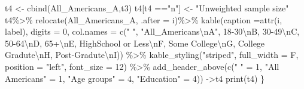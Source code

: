 \documentclass[
]{article}
\newenvironment{Shaded}{\begin{snugshade}}{\end{snugshade}}
\newcommand{\AttributeTok}[1]{\textcolor[rgb]{0.77,0.63,0.00}{#1}}
\newcommand{\DecValTok}[1]{\textcolor[rgb]{0.00,0.00,0.81}{#1}}
\newcommand{\FunctionTok}[1]{\textcolor[rgb]{0.00,0.00,0.00}{#1}}
\newcommand{\NormalTok}[1]{#1}
\newcommand{\OtherTok}[1]{\textcolor[rgb]{0.56,0.35,0.01}{#1}}
\newcommand{\SpecialCharTok}[1]{\textcolor[rgb]{0.00,0.00,0.00}{#1}}
\newcommand{\StringTok}[1]{\textcolor[rgb]{0.31,0.60,0.02}{#1}}
\begin{document}
\begin{Shaded}
\begin{Highlighting}[]
\NormalTok{t4 }\OtherTok{\textless{}{-}} \FunctionTok{cbind}\NormalTok{(All\_Americans\_A,t3)}
\NormalTok{t4[t4 }\SpecialCharTok{==}\StringTok{"n"}\NormalTok{] }\OtherTok{\textless{}{-}} \StringTok{"Unweighted sample size"}
\NormalTok{t4}\SpecialCharTok{\%\textgreater{}\%}
  \FunctionTok{relocate}\NormalTok{(All\_Americans\_A, }\AttributeTok{.after =}\NormalTok{ i)}\SpecialCharTok{\%\textgreater{}\%}
  \FunctionTok{kable}\NormalTok{(}\AttributeTok{caption =}\FunctionTok{attr}\NormalTok{(i, }\StringTok{\textquotesingle{}label\textquotesingle{}}\NormalTok{), }\AttributeTok{digits =} \DecValTok{0}\NormalTok{, }
        \AttributeTok{col.names =} \FunctionTok{c}\NormalTok{(}\StringTok{" "}\NormalTok{, }\StringTok{"All\_Americans}\SpecialCharTok{\textbackslash{}n}\StringTok{A"}\NormalTok{, }\StringTok{\textquotesingle{}18{-}30}\SpecialCharTok{\textbackslash{}n}\StringTok{B\textquotesingle{}}\NormalTok{, }\StringTok{\textquotesingle{}30{-}49}\SpecialCharTok{\textbackslash{}n}\StringTok{C\textquotesingle{}}\NormalTok{, }\StringTok{\textquotesingle{}50{-}64}\SpecialCharTok{\textbackslash{}n}\StringTok{D\textquotesingle{}}\NormalTok{, }\StringTok{\textquotesingle{}65+}\SpecialCharTok{\textbackslash{}n}\StringTok{E\textquotesingle{}}\NormalTok{,}
                      \StringTok{\textquotesingle{}HighSchool or Less}\SpecialCharTok{\textbackslash{}n}\StringTok{F\textquotesingle{}}\NormalTok{, }\StringTok{\textquotesingle{}Some College}\SpecialCharTok{\textbackslash{}n}\StringTok{G\textquotesingle{}}\NormalTok{, }\StringTok{\textquotesingle{}College  Gradute}\SpecialCharTok{\textbackslash{}n}\StringTok{H\textquotesingle{}}\NormalTok{,}
                      \StringTok{\textquotesingle{}Post{-}Gradute}\SpecialCharTok{\textbackslash{}n}\StringTok{I\textquotesingle{}}\NormalTok{)) }\SpecialCharTok{\%\textgreater{}\%}
  \FunctionTok{kable\_styling}\NormalTok{(}\StringTok{"striped"}\NormalTok{, }\AttributeTok{full\_width =}\NormalTok{ F,}
                \AttributeTok{position =} \StringTok{"left"}\NormalTok{, }\AttributeTok{font\_size =} \DecValTok{12}\NormalTok{) }\SpecialCharTok{\%\textgreater{}\%}
  \FunctionTok{add\_header\_above}\NormalTok{(}\FunctionTok{c}\NormalTok{(}\StringTok{" "} \OtherTok{=} \DecValTok{1}\NormalTok{, }\StringTok{"All Americans"} \OtherTok{=} \DecValTok{1}\NormalTok{, }\StringTok{"Age groups"} \OtherTok{=} \DecValTok{4}\NormalTok{, }\StringTok{"Education"} \OtherTok{=} \DecValTok{4}\NormalTok{)) }\OtherTok{{-}\textgreater{}}\NormalTok{t4}
\FunctionTok{print}\NormalTok{(t4)}
\NormalTok{\}}
\end{Highlighting}
\end{Shaded}
\end{document}
